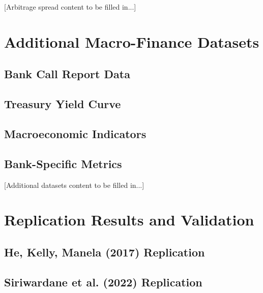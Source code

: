 \documentclass{article}
\begin{document}
[Arbitrage spread content to be filled in...]

\section{Additional Macro-Finance Datasets}
\label{sec:additional_datasets}


\subsection{Bank Call Report Data}

\subsection{Treasury Yield Curve}

\subsection{Macroeconomic Indicators}

\subsection{Bank-Specific Metrics}

[Additional datasets content to be filled in...]

\section{Replication Results and Validation}
\label{sec:replication}


\subsection{He, Kelly, Manela (2017) Replication}

\subsection{Siriwardane et al. (2022) Replication}
\end{document}
